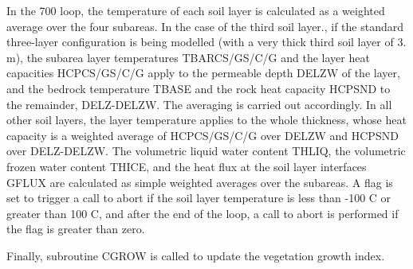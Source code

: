 In the 700 loop, the temperature of each soil layer is calculated as a weighted average over the four subareas. In the case of the third soil layer., if the standard three-\/layer configuration is being modelled (with a very thick third soil layer of 3. m), the subarea layer temperatures T\+B\+A\+R\+C\+S/\+G\+S/\+C/\+G and the layer heat capacities H\+C\+P\+C\+S/\+G\+S/\+C/\+G apply to the permeable depth D\+E\+L\+Z\+W of the layer, and the bedrock temperature T\+B\+A\+S\+E and the rock heat capacity H\+C\+P\+S\+N\+D to the remainder, D\+E\+L\+Z-\/\+D\+E\+L\+Z\+W. The averaging is carried out accordingly. In all other soil layers, the layer temperature applies to the whole thickness, whose heat capacity is a weighted average of H\+C\+P\+C\+S/\+G\+S/\+C/\+G over D\+E\+L\+Z\+W and H\+C\+P\+S\+N\+D over D\+E\+L\+Z-\/\+D\+E\+L\+Z\+W. The volumetric liquid water content T\+H\+L\+I\+Q, the volumetric frozen water content T\+H\+I\+C\+E, and the heat flux at the soil layer interfaces G\+F\+L\+U\+X are calculated as simple weighted averages over the subareas. A flag is set to trigger a call to abort if the soil layer temperature is less than -\/100 C or greater than 100 C, and after the end of the loop, a call to abort is performed if the flag is greater than zero.

Finally, subroutine C\+G\+R\+O\+W is called to update the vegetation growth index.